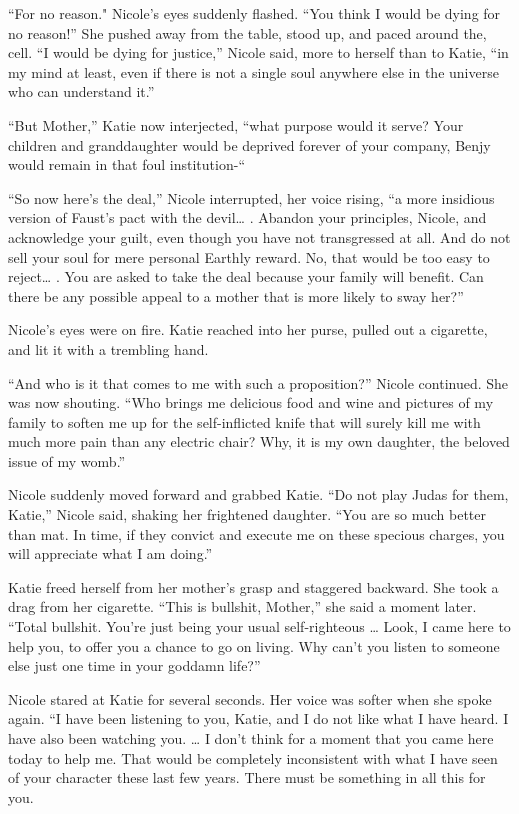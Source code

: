 \documentclass[]{article}
\begin{document}
{{“For no reason."  Nicole’s eyes suddenly flashed.  “You think I would be dying for no reason!” She pushed away from the table, stood up, and paced around the, cell.  “I would be dying for justice,” Nicole said, more to herself than to Katie, “in my mind at least, even if there is not a single soul anywhere else in the universe who can understand it.”

“But Mother,” Katie now interjected, “what purpose would it serve? Your children and granddaughter would be deprived forever of your company, Benjy would remain in that foul institution-“

“So now here’s the deal,” Nicole interrupted, her voice rising, “a more insidious version of Faust’s pact with the devil… .  Abandon your principles, Nicole, and acknowledge your guilt, even though you have not transgressed at all.  And do not sell your soul for mere personal Earthly reward.  No, that would be too easy to reject… .  You are asked to take the deal because your family will benefit.  Can there be any possible appeal to a mother that is more likely to sway her?”

Nicole’s eyes were on fire.  Katie reached into her purse, pulled out a cigarette, and lit it with a trembling hand.

“And who is it that comes to me with such a proposition?” Nicole continued.  She was now shouting.  “Who brings me delicious food and wine and pictures of my family to soften me up for the self-inflicted knife that will surely kill me with much more pain than any electric chair? Why, it is my own daughter, the beloved issue of my womb.”

Nicole suddenly moved forward and grabbed Katie.  “Do not play Judas for them, Katie,” Nicole said, shaking her frightened daughter.  “You are so much better than mat.  In time, if they convict and execute me on these specious charges, you will appreciate what I am doing.”

Katie freed herself from her mother’s grasp and staggered backward.  She took a drag from her cigarette.  “This is bullshit, Mother,” she said a moment later.  “Total bullshit.  You’re just being your usual self-righteous … Look, I came here to help you, to offer you a chance to go on living.  Why can’t you listen to someone else just one time in your goddamn life?”

Nicole stared at Katie for several seconds.  Her voice was softer when she spoke again.  “I have been listening to you, Katie, and I do not like what I have heard.  I have also been watching you.  … I don’t think for a moment that you came here today to help me.  That would be completely inconsistent with what I have seen of your character these last few years.  There must be something in all this for you.

}}
\end{document}

